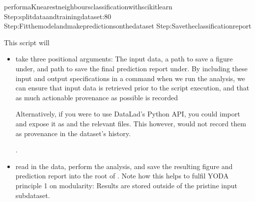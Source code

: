 \begin{sphinxVerbatim}[commandchars=\\\{\}]
performaK\PYGZhy{}nearest\PYGZhy{}neighboursclassificationwithscikit\PYGZhy{}learn
Step:splitdataandtrainingdataset:80
Step:Fitthemodelandmakepredictionsonthedataset
Step:Savetheclassificationreport
\end{sphinxVerbatim}
\sphinxresetverbatimhllines

\sphinxAtStartPar
This script will
\begin{itemize}
\item {} 
\sphinxAtStartPar
take three positional arguments: The input data, a path to save a figure under, and path to save the final prediction report under. By including these input and output specifications in a  command when we run the analysis, we can ensure that input data is retrieved prior to the script execution, and that as much actionable provenance as possible is recorded%
\begin{footnote}\sphinxAtStartFootnote
Alternatively, if you were to use DataLad’s Python API, you could import and expose it as  and  the relevant files. This however, would not record them as provenance in the dataset’s history.
%
\end{footnote}.

\item {} 
\sphinxAtStartPar
read in the data, perform the analysis, and save the resulting figure and  prediction report into the root of . Note how this helps to fulfil YODA principle 1 on modularity:
Results are stored outside of the pristine input subdataset.

\end{itemize}

